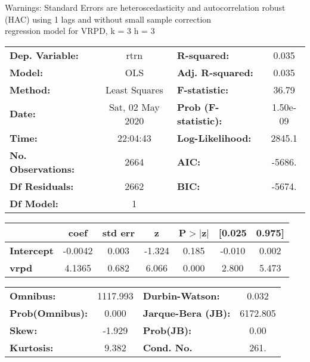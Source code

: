 Warnings: \newline
 [1] Standard Errors are heteroscedasticity and autocorrelation robust (HAC) using 1 lags and without small sample correction\\ 

regression model for VRPD, k = 3 h = 3\begin{center}
\begin{tabular}{lclc}
\toprule
\textbf{Dep. Variable:}    &       rtrn       & \textbf{  R-squared:         } &     0.035   \\
\textbf{Model:}            &       OLS        & \textbf{  Adj. R-squared:    } &     0.035   \\
\textbf{Method:}           &  Least Squares   & \textbf{  F-statistic:       } &     36.79   \\
\textbf{Date:}             & Sat, 02 May 2020 & \textbf{  Prob (F-statistic):} &  1.50e-09   \\
\textbf{Time:}             &     22:04:43     & \textbf{  Log-Likelihood:    } &    2845.1   \\
\textbf{No. Observations:} &        2664      & \textbf{  AIC:               } &    -5686.   \\
\textbf{Df Residuals:}     &        2662      & \textbf{  BIC:               } &    -5674.   \\
\textbf{Df Model:}         &           1      & \textbf{                     } &             \\
\bottomrule
\end{tabular}
\begin{tabular}{lcccccc}
                   & \textbf{coef} & \textbf{std err} & \textbf{z} & \textbf{P$> |$z$|$} & \textbf{[0.025} & \textbf{0.975]}  \\
\midrule
\textbf{Intercept} &      -0.0042  &        0.003     &    -1.324  &         0.185        &       -0.010    &        0.002     \\
\textbf{vrpd}      &       4.1365  &        0.682     &     6.066  &         0.000        &        2.800    &        5.473     \\
\bottomrule
\end{tabular}
\begin{tabular}{lclc}
\textbf{Omnibus:}       & 1117.993 & \textbf{  Durbin-Watson:     } &    0.032  \\
\textbf{Prob(Omnibus):} &   0.000  & \textbf{  Jarque-Bera (JB):  } & 6172.805  \\
\textbf{Skew:}          &  -1.929  & \textbf{  Prob(JB):          } &     0.00  \\
\textbf{Kurtosis:}      &   9.382  & \textbf{  Cond. No.          } &     261.  \\
\bottomrule
\end{tabular}
\end{center}

